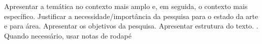 
Apresentar a temática no contexto mais amplo e, em seguida, o contexto mais específico. Justificar a necessidade/importância da pesquisa para o estado da arte e para área. Apresentar os objetivos da pesquisa. Apresentar estrutura do texto. \cite{IEEEexample:techrepstdsub}. Quando necessário, usar notas de rodapé\footnotemark[1]
